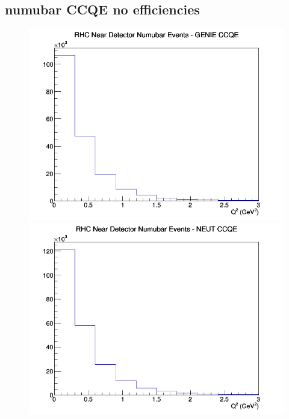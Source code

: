 \subsection{numubar CCQE no efficiencies}
\begin{figure}[h]
\includegraphics[width=\linewidth]{Q2/nominal/CCQE_RHC_ND_numubar_Q2_GENIE.png}
\endminipage
{}
\includegraphics[width=\linewidth]{Q2/nominal/CCQE_RHC_ND_numubar_Q2_NEUT.png}
\endminipage
{}

\end{figure}
